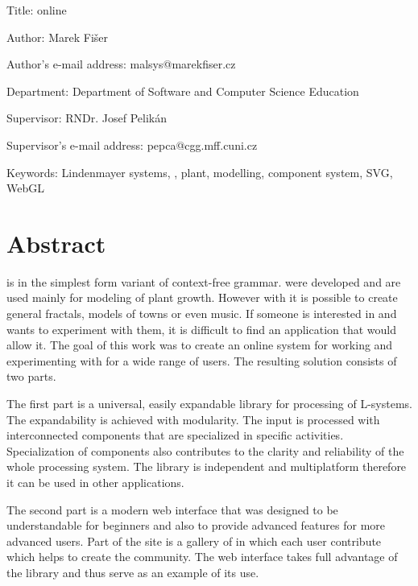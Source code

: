 \clearpage
{%
\setlength\parindent{0mm}%
\setlength\parskip{5mm}%
Title: \lsystems online

Author: Marek Fišer

Author's e-mail address: malsys@marekfiser.cz

Department: Department of Software and Computer Science Education

Supervisor: RNDr. Josef Pelikán

Supervisor's e-mail address: pepca@cgg.mff.cuni.cz

Keywords: Lindenmayer systems, \lsystems, plant, modelling, component system, SVG, WebGL

\section*{Abstract}
}
\lsystem is in the simplest form variant of context-free grammar.
\lsystems were developed and are used mainly for modeling of plant growth.
However with \lsystems it is possible to create general fractals, models of towns or even music.
If someone is interested in \lsystems and wants to experiment with them, it is difficult to find an application that would allow it.
The goal of this work was to create an online system for working and experimenting with \lsystems for a wide range of users.
The resulting solution consists of two parts.

The first part is a universal, easily expandable library for processing of \mbox{L-sys}\-tems.
The expandability is achieved with modularity.
The input is processed with interconnected components that are specialized in specific activities.
Specialization of components also contributes to the clarity and reliability of the whole processing system.
The library is independent and multiplatform therefore it can be used in other applications.

The second part is a modern web interface that was designed to be understandable for beginners and also to provide advanced features for more advanced users.
Part of the site is a gallery of \lsystems in which each user contribute which helps to create the community.
The web interface takes full advantage of the library and thus serve as an example of its use.




































